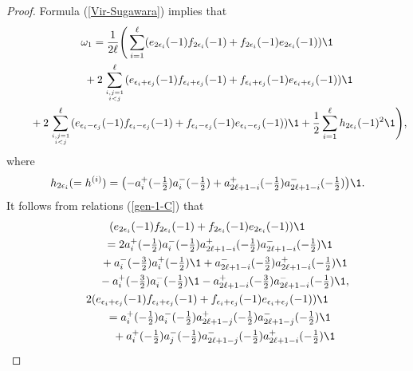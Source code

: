 \documentclass[pdftex]{sigma}
\begin{document}
\begin{proof} Formula (\ref{Vir-Sugawara}) implies that
\begin{gather} \omega_1 = \frac{1}{2 \ell} \Bigg(
\sum_{i=1}^{\ell} (e_{2 \epsilon _{i}}(-1)f_{2 \epsilon
_{i}}(-1)+f_{2 \epsilon
_{i}}(-1)e_{2 \epsilon _{i}}(-1)){\1} \nonumber \\
\hphantom{\omega_1 =}{}  +2 \sum_{i,j=1 \atop i<j}^{\ell} (e_{\epsilon _{i}+ \epsilon
_{j}}(-1)f_{\epsilon _{i}+ \epsilon _{j}}(-1)+ f_{\epsilon _{i}+
\epsilon _{j}}(-1)e_{\epsilon _{i}+ \epsilon _{j}}(-1)){\1} \nonumber \\
\hphantom{\omega_1 =}{}
  +2 \sum_{i,j=1 \atop i<j}^{\ell} (e_{\epsilon _{i}- \epsilon
_{j}}(-1)f_{\epsilon _{i}- \epsilon _{j}}(-1)+ f_{\epsilon _{i}-
\epsilon _{j}}(-1)e_{\epsilon _{i}- \epsilon _{j}}(-1)){\1}
  +\frac{1}{2}\sum_{i=1}^{\ell} h_{2 \epsilon _{i}}(-1)^2 {\1}
\Bigg),\label{proof-Vir-1}
 \end{gather}
where
\begin{gather*} h_{2 \epsilon _{i}} (=h^{(i)})= \big({-}a_i ^+ (-\tfrac{1}{2}) a_i^-(
-\tfrac{1}{2})+ a_{2\ell +1-i} ^+ (-\tfrac{1}{2}) a_{2\ell +1-i}^-(
-\tfrac{1}{2}) \big){\1}.
 \end{gather*}
It follows from relations (\ref{gen-1-C}) that
\begin{gather}
 (e_{2 \epsilon _{i}}(-1)f_{2 \epsilon
_{i}}(-1)+f_{2
\epsilon _{i}}(-1)e_{2 \epsilon _{i}}(-1)){\1}\nonumber\\
\qquad{}
 = 2 a_i ^+ (-\tfrac{1}{2})a_i ^- (-\tfrac{1}{2}) a_{2\ell +1-i}
^+ (-\tfrac{1}{2}) a_{2\ell +1-i} ^- (-\tfrac{1}{2}){\1} \nonumber \\
\quad\qquad{} + a_i ^- (-\tfrac{3}{2})a_i ^+ (-\tfrac{1}{2}){\1}  + a_{2\ell
+1-i} ^- (-\tfrac{3}{2})a_{2\ell +1-i} ^+ (-\tfrac{1}{2}){\1} \nonumber \\
\quad\qquad{} -a_i ^+ (-\tfrac{3}{2})a_i ^- (-\tfrac{1}{2}){\1}  - a_{2\ell
+1-i} ^+ (-\tfrac{3}{2})a_{2\ell +1-i} ^- (-\tfrac{1}{2}){\1},\label{proof-Vir-2}
\\
 2(e_{\epsilon _{i}+ \epsilon
_{j}}(-1)f_{\epsilon _{i}+ \epsilon _{j}}(-1)+ f_{\epsilon _{i}+
\epsilon _{j}}(-1)e_{\epsilon _{i}+
\epsilon _{j}}(-1)){\1}  \nonumber\\
\qquad{}
 = a_i ^+ (-\tfrac{1}{2})a_i ^- (-\tfrac{1}{2}) a_{2\ell +1-j} ^+
(-\tfrac{1}{2}) a_{2\ell +1-j} ^- (-\tfrac{1}{2}){\1} \nonumber \\
\quad\qquad{} + a_i ^+ (-\tfrac{1}{2})a_j ^- (-\tfrac{1}{2}) a_{2\ell +1-j} ^-
(-\tfrac{1}{2})
a_{2\ell +1-i} ^+ (-\tfrac{1}{2}){\1} \nonumber \\

\end{gather}
\end{proof}
\end{document}
